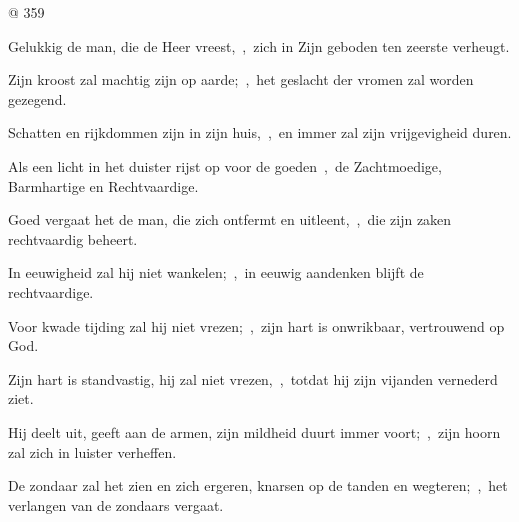 \documentclass[12pt,twoside,a5paper]{article}
\begin{document}
\psalmsubtitle{}

\begin{halfparskip}
\end{halfparskip}






@ 359

\begin{halfparskip}
  Gelukkig de man, die de Heer vreest,~\sep\ zich in Zijn geboden ten zeerste verheugt.


  Zijn kroost zal machtig zijn op aarde;~\sep\ het geslacht der vromen zal worden gezegend.

  Schatten en rijkdommen zijn in zijn huis,~\sep\ en immer zal zijn vrijgevigheid duren.

  Als een licht in het duister rijst op voor de goeden~\sep\ de Zachtmoedige, Barmhartige en Rechtvaardige.

  Goed vergaat het de man, die zich ontfermt en uitleent,~\sep\ die zijn zaken rechtvaardig beheert.

  In eeuwigheid zal hij niet wankelen;~\sep\ in eeuwig aandenken blijft de rechtvaardige.

  Voor kwade tijding zal hij niet vrezen;~\sep\ zijn hart is onwrikbaar, vertrouwend op God.

  Zijn hart is standvastig, hij zal niet vrezen,~\sep\ totdat hij zijn vijanden vernederd ziet.

  Hij deelt uit, geeft aan de armen, zijn mildheid duurt immer voort;~\sep\ zijn hoorn zal zich in luister verheffen.

  De zondaar zal het zien en zich ergeren, knarsen op de tanden en wegteren;~\sep\ het verlangen van de zondaars vergaat.
\end{halfparskip}

\end{document}

